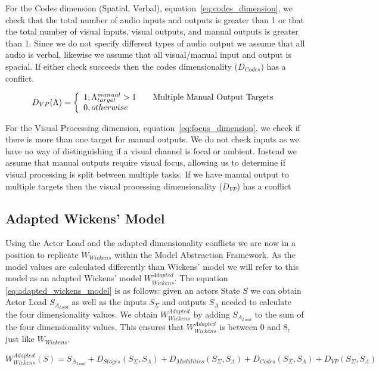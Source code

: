 For the Codes dimension (Spatial, Verbal), equation~\ref{eq:codes_dimension}, we check that the total number of audio inputs and outputs is greater than 1 or that the total number of visual inputs, visual outputs, and manual outputs is greater than 1.  Since we do not specify different types of audio output we assume that all audio is verbal, likewise we assume that all visual/manual input and output is spacial.  If either check succeeds then the codes dimensionality ($D_{Codes}$) has a conflict.

\begin{equation}
D_{VP}(\Lambda) = \left\{ 
  \begin{array}{l l}
    1, \Lambda_{target}^{manual} > 1 & \quad \text{Multiple Manual Output Targets}\\
    0, otherwise
  \end{array}
  \right.
  \label{eq:focus_dimension}
\end{equation}

For the Visual Processing dimension, equation~\ref{eq:focus_dimension}, we check if there is more than one target for manual outputs.  We do not check inputs as we have no way of distinguishing if a visual channel is focal or ambient.  Instead we assume that manual outputs require visual focus, allowing us to determine if visual processing is split between multiple tasks.  If we have manual output to multiple targets then the visual processing dimensionality ($D_{VP}$) has a conflict

\subsection{Adapted Wickens' Model}
Using the Actor Load and the adapted dimensionality conflicts we are now in a position to replicate $W_{Wickens}$ within the Model Abstraction Framework.  As the model values are calculated differently than Wickens' model we will refer to this model as an adapted Wickens' model $W_{Wickens}^{Adapted}$.  The equation \ref{eq:adapted_wickens_model} is as follows: given an actors State $S$ we can obtain Actor Load $S_{A_{Load}}$ as well as the inputs $S_{\Sigma}$ and outputs $S_{\Lambda}$ needed to calculate the four dimensionality values.  We obtain $W_{Wickens}^{Adapted}$ by adding $S_{A_{Load}}$  to the sum of the four dimensionality values.  This ensures that $W_{Wickens}^{Adapted}$ is between 0 and 8, just like $W_{Wickens}$.

\begin{equation}
  W_{Wickens}^{Adapted}(S) = S_{A_{Load}} + D_{Stages}(S_{\Sigma}, S_{\Lambda}) + D_{Modalities}(S_{\Sigma}, S_{\Lambda}) + D_{Codes}(S_{\Sigma}, S_{\Lambda}) + D_{VP}(S_{\Sigma}, S_{\Lambda})
  \label{eq:adapted_wickens_model}
\end{equation}

